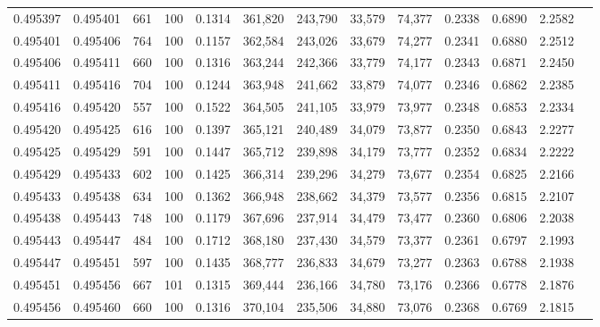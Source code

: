\begin{tabular}{rrrrrrrrrrrrr}
0.495397 & 0.495401 &   661 & 100 &                                     0.1314 & 361,820 & 243,790 &  33,579 &  74,377 & 0.2338 & 0.6890 & 2.2582 \\
0.495401 & 0.495406 &   764 & 100 &                                     0.1157 & 362,584 & 243,026 &  33,679 &  74,277 & 0.2341 & 0.6880 & 2.2512 \\
0.495406 & 0.495411 &   660 & 100 &                                     0.1316 & 363,244 & 242,366 &  33,779 &  74,177 & 0.2343 & 0.6871 & 2.2450 \\
0.495411 & 0.495416 &   704 & 100 &                                     0.1244 & 363,948 & 241,662 &  33,879 &  74,077 & 0.2346 & 0.6862 & 2.2385 \\
0.495416 & 0.495420 &   557 & 100 &                                     0.1522 & 364,505 & 241,105 &  33,979 &  73,977 & 0.2348 & 0.6853 & 2.2334 \\
0.495420 & 0.495425 &   616 & 100 &                                     0.1397 & 365,121 & 240,489 &  34,079 &  73,877 & 0.2350 & 0.6843 & 2.2277 \\
0.495425 & 0.495429 &   591 & 100 &                                     0.1447 & 365,712 & 239,898 &  34,179 &  73,777 & 0.2352 & 0.6834 & 2.2222 \\
0.495429 & 0.495433 &   602 & 100 &                                     0.1425 & 366,314 & 239,296 &  34,279 &  73,677 & 0.2354 & 0.6825 & 2.2166 \\
0.495433 & 0.495438 &   634 & 100 &                                     0.1362 & 366,948 & 238,662 &  34,379 &  73,577 & 0.2356 & 0.6815 & 2.2107 \\
0.495438 & 0.495443 &   748 & 100 &                                     0.1179 & 367,696 & 237,914 &  34,479 &  73,477 & 0.2360 & 0.6806 & 2.2038 \\
0.495443 & 0.495447 &   484 & 100 &                                     0.1712 & 368,180 & 237,430 &  34,579 &  73,377 & 0.2361 & 0.6797 & 2.1993 \\
0.495447 & 0.495451 &   597 & 100 &                                     0.1435 & 368,777 & 236,833 &  34,679 &  73,277 & 0.2363 & 0.6788 & 2.1938 \\
0.495451 & 0.495456 &   667 & 101 &                                     0.1315 & 369,444 & 236,166 &  34,780 &  73,176 & 0.2366 & 0.6778 & 2.1876 \\
0.495456 & 0.495460 &   660 & 100 &                                     0.1316 & 370,104 & 235,506 &  34,880 &  73,076 & 0.2368 & 0.6769 & 2.1815 \\

\end{tabular}
